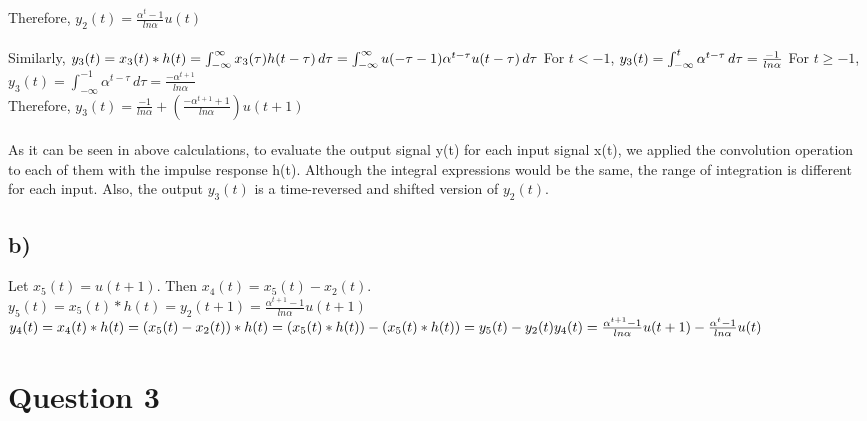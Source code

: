 \documentclass[12pt]{article}
\begin{document}
     Therefore, \begin{math} y_2(t) = \frac{\alpha^t-1}{ln\alpha}u(t)  
    \end{math} \\ \\
   Similarly, 
 \begin{math}
      y_3(t) = x_3(t)*h(t) = \int_{-\infty}^{\infty} x_3(\tau)h(t-\tau) \,d\tau = \int_{-\infty}^{\infty} u(-\tau-1)\alpha^{t-\tau}u(t-\tau) \,d\tau \\
    \end{math}
    For \(t < -1\),
    \begin{math}
      y_3(t) = \int_{-\infty}^{t} \alpha^{t-\tau} \,d\tau = \frac{-1}{ln\alpha} \\
    \end{math}
    For \(t \geq -1\),
    \begin{math}
      y_3(t) = \int_{-\infty}^{-1} \alpha^{t-\tau} \,d\tau = \frac{-\alpha^{t+1}}{ln\alpha} \end{math} \\
      Therefore, \begin{math} y_3(t) = \frac{-1}{ln\alpha} + (\frac{-\alpha^{t+1} + 1}{ln\alpha})u(t+1)
    \end{math} \\ \\
     As it can be seen in above calculations, to evaluate the output signal y(t) for each input signal x(t), we applied the convolution operation to each of them with the impulse response h(t). Although the integral expressions would be the same, the range of integration is different for each input. Also, the output \(y_3(t)\) is a time-reversed and shifted version of \(y_2(t)\).    

    \subsection*{b)}
    Let \(x_5(t) = u(t+1)\). Then \(x_4(t) = x_5(t) - x_2(t)\).\\
    \(y_5(t) = x_5(t)*h(t) = y_2(t+1) = \frac{\alpha^{t+1}-1}{ln\alpha}u(t+1)\)\\
    \(y_4(t) = x_4(t)*h(t) = (x_5(t) - x_2(t))*h(t)\\
    = (x_5(t)*h(t)) - (x_5(t)*h(t))\\
    = y_5(t) - y_2(t) \\
    y_4(t) = \frac{\alpha^{t+1}-1}{ln\alpha}u(t+1) - \frac{\alpha^t-1}{ln\alpha}u(t)
    \)


    \section*{Question 3}
\end{document}
